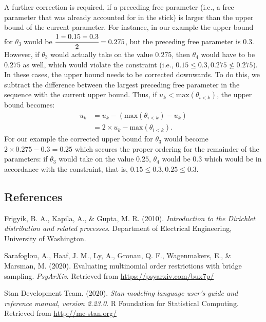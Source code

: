 \documentclass[
  english,
  man,floatsintext]{apa6}
\begin{document}
\begin{appendix}
A further correction is required, if a preceding free parameter (i.e., a
free parameter that was already accounted for in the stick) is larger
than the upper bound of the current parameter. For instance, in our
example the upper bound for \(\theta_3\) would be
\(\cfrac{1 - 0.15 - 0.3}{2} = 0.275\), but the preceding free parameter
is \(0.3\). However, if \(\theta_3\) would actually take on the value
\(0.275\), then \(\theta_4\) would have to be \(0.275\) as well, which
would violate the constraint (i.e.,
\(0.15 \leq 0.3, 0.275 \nleq 0.275\)). In these cases, the upper bound
needs to be corrected downwards. To do this, we subtract the difference
between the largest preceding free parameter in the sequence with the
current upper bound. Thus, if \(u_k < \text{max}(\theta_{i < k})\), the
upper bound becomes: \begin{align}
u_k &= u_k - (\text{max}(\theta_{i < k}) - u_k) \\
&= 2 \times u_k - \text{max}(\theta_{i < k}).
\end{align} For our example the corrected upper bound for \(\theta_3\)
would become \(2 \times 0.275 - 0.3 = 0.25\) which secures the proper
ordering for the remainder of the parameters: if \(\theta_3\) would take
on the value \(0.25\), \(\theta_4\) would be \(0.3\) which would be in
accordance with the constraint, that is,
\(0.15 \leq 0.3, 0.25 \leq 0.3\).

\hypertarget{references}{%
\subsection{References}\label{references}}

\begingroup
\setlength{\parindent}{-0.5in}
\setlength{\leftskip}{0.5in}

\hypertarget{refs}{}
\leavevmode\hypertarget{ref-frigyik2010introduction}{}%
Frigyik, B. A., Kapila, A., \& Gupta, M. R. (2010). \emph{Introduction
to the Dirichlet distribution and related processes}. Department of
Electrical Engineering, University of Washington.

\leavevmode\hypertarget{ref-sarafoglou2020evaluatingPreprint}{}%
Sarafoglou, A., Haaf, J. M., Ly, A., Gronau, Q. F., Wagenmakers, E., \&
Marsman, M. (2020). Evaluating multinomial order restrictions with
bridge sampling. \emph{PsyArXiv}. Retrieved from
\url{https://psyarxiv.com/bux7p/}

\leavevmode\hypertarget{ref-stan2020}{}%
Stan Development Team. (2020). \emph{Stan modeling language user's guide
and reference manual, version 2.23.0}. R Foundation for Statistical
Computing. Retrieved from \url{http://mc-stan.org/}

\endgroup
\end{appendix}
\end{document}
